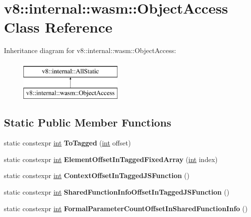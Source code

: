 \hypertarget{classv8_1_1internal_1_1wasm_1_1ObjectAccess}{}\section{v8\+:\+:internal\+:\+:wasm\+:\+:Object\+Access Class Reference}
\label{classv8_1_1internal_1_1wasm_1_1ObjectAccess}
Inheritance diagram for v8\+:\+:internal\+:\+:wasm\+:\+:Object\+Access\+:\begin{figure}[H]
\begin{center}
\leavevmode
\includegraphics[height=2.000000cm]{classv8_1_1internal_1_1wasm_1_1ObjectAccess}
\end{center}
\end{figure}
\subsection*{Static Public Member Functions}
\begin{DoxyCompactItemize}
\item 
\mbox{\label{classv8_1_1internal_1_1wasm_1_1ObjectAccess_aa1a69300187696ead1e3dd15daa7a0f7}} 
static constexpr \mbox{\hyperlink{classint}{int}} {\bfseries To\+Tagged} (\mbox{\hyperlink{classint}{int}} offset)
\item 
\mbox{\label{classv8_1_1internal_1_1wasm_1_1ObjectAccess_a2349171a0759be25e5b13b471346ca61}} 
static constexpr \mbox{\hyperlink{classint}{int}} {\bfseries Element\+Offset\+In\+Tagged\+Fixed\+Array} (\mbox{\hyperlink{classint}{int}} index)
\item 
\mbox{\label{classv8_1_1internal_1_1wasm_1_1ObjectAccess_a5f374ffa2084af90a27df1a5392b8da4}} 
static constexpr \mbox{\hyperlink{classint}{int}} {\bfseries Context\+Offset\+In\+Tagged\+J\+S\+Function} ()
\item 
\mbox{\label{classv8_1_1internal_1_1wasm_1_1ObjectAccess_a21db69163b8e6a78c756e53db6d5d594}} 
static constexpr \mbox{\hyperlink{classint}{int}} {\bfseries Shared\+Function\+Info\+Offset\+In\+Tagged\+J\+S\+Function} ()
\item 
\mbox{\label{classv8_1_1internal_1_1wasm_1_1ObjectAccess_a7e9f255df4709a9b260e173f8d6f8870}} 
static constexpr \mbox{\hyperlink{classint}{int}} {\bfseries Formal\+Parameter\+Count\+Offset\+In\+Shared\+Function\+Info} ()
\end{DoxyCompactItemize}


